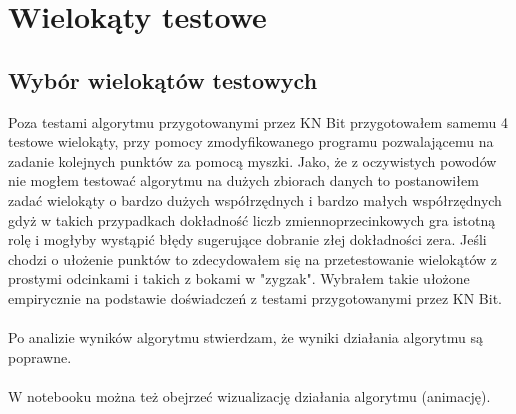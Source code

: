 \documentclass[a4paper]{article}
\begin{document}
    \pagebreak
\section{Wielokąty testowe}
    \subsection{Wybór wielokątów testowych}    
    Poza testami algorytmu przygotowanymi przez KN Bit przygotowałem samemu 4 testowe wielokąty,
    przy pomocy zmodyfikowanego programu pozwalającemu na zadanie kolejnych punktów za pomocą myszki.
    Jako, że z oczywistych powodów nie mogłem testować algorytmu na dużych zbiorach danych 
    to postanowiłem zadać wielokąty o bardzo dużych współrzędnych i bardzo małych współrzędnych
    gdyż w takich przypadkach dokładność liczb zmiennoprzecinkowych gra istotną rolę i mogłyby 
    wystąpić błędy sugerujące dobranie złej dokładności zera. Jeśli chodzi o ułożenie punktów
    to zdecydowałem się na przetestowanie wielokątów z prostymi odcinkami i takich z 
    bokami w "zygzak". Wybrałem takie ułożone empirycznie na podstawie doświadczeń z 
    testami przygotowanymi przez KN Bit.\\\\
    Po analizie wyników algorytmu stwierdzam, że wyniki działania algorytmu są poprawne. \\\\
    W notebooku można też obejrzeć wizualizację działania algorytmu (animację).
    \pagebreak
\end{document}
